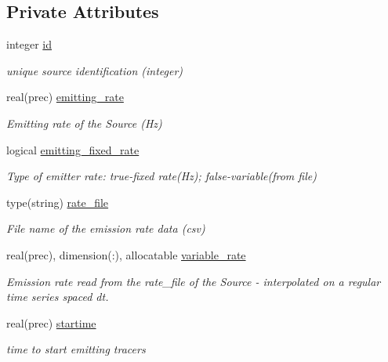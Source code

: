 \subsection*{Private Attributes}
\begin{DoxyCompactItemize}
\item 
integer \mbox{\hyperlink{structsources__mod_1_1source__par_a88d333946d18fee527b7b207f44dd3ff}{id}}
\begin{DoxyCompactList}\small\item\em unique source identification (integer) \end{DoxyCompactList}\item 
real(prec) \mbox{\hyperlink{structsources__mod_1_1source__par_a8374d8f2d32dfa9e9f5863c7a45d0e1d}{emitting\+\_\+rate}}
\begin{DoxyCompactList}\small\item\em Emitting rate of the Source (Hz) \end{DoxyCompactList}\item 
logical \mbox{\hyperlink{structsources__mod_1_1source__par_a957d4184d9cd997abeac05c04821139c}{emitting\+\_\+fixed\+\_\+rate}}
\begin{DoxyCompactList}\small\item\em Type of emitter rate\+: true-\/fixed rate(\+Hz); false-\/variable(from file) \end{DoxyCompactList}\item 
type(string) \mbox{\hyperlink{structsources__mod_1_1source__par_ae236b50563bb0dadd55af1aadac3023e}{rate\+\_\+file}}
\begin{DoxyCompactList}\small\item\em File name of the emission rate data (csv) \end{DoxyCompactList}\item 
real(prec), dimension(\+:), allocatable \mbox{\hyperlink{structsources__mod_1_1source__par_ad5a8b90aed8636e98daafb1ede1390fd}{variable\+\_\+rate}}
\begin{DoxyCompactList}\small\item\em Emission rate read from the rate\+\_\+file of the Source -\/ interpolated on a regular time series spaced dt. \end{DoxyCompactList}\item 
real(prec) \mbox{\hyperlink{structsources__mod_1_1source__par_a86f38cfdf7cd0bc42a72785aca69b9f9}{startime}}
\begin{DoxyCompactList}\small\item\em time to start emitting tracers \end{DoxyCompactList}\item 

\end{DoxyCompactItemize}
